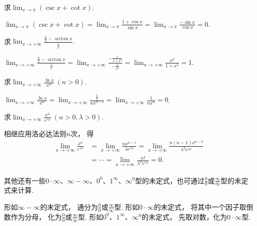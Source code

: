\begin{example}
求\(\lim_{x\to\pi} (\csc x+\cot x)\).
\begin{solution}
\(\lim_{x\to\pi} (\csc x+\cot x)
= \lim_{x\to\pi} \frac{1+\cos x}{\sin x}
= \lim_{x\to\pi} \frac{-\sin x}{\cos x}
= 0\).
\end{solution}
\end{example}

\begin{example}
求\(\lim_{x\to+\infty} \frac{\frac{\pi}{2} - \arctan x}{\frac{1}{x}}\).
\begin{solution}
\(\lim_{x\to+\infty} \frac{\frac{\pi}{2} - \arctan x}{\frac{1}{x}}
= \lim_{x\to+\infty} \frac{-\frac{1}{1+x^2}}{-\frac{1}{x^2}}
= \lim_{x\to+\infty} \frac{x^2}{1+x^2} = 1\).
\end{solution}
\end{example}

\begin{example}
求\(\lim_{x\to+\infty} \frac{\ln x}{x^n}\ (n>0)\).
\begin{solution}
\(\lim_{x\to+\infty} \frac{\ln x}{x^n}
= \lim_{x\to+\infty} \frac{\frac{1}{x}}{n x^{n-1}}
= \lim_{x\to+\infty} \frac{1}{n x^n} = 0\).
\end{solution}
\end{example}

\begin{example}
求\(\lim_{x\to+\infty} \frac{x^n}{e^{\lambda x}}\ (n>0,\lambda>0)\).
\begin{solution}
相继应用洛必达法则\(n\)次，
得\begin{align*}
	\lim_{x\to+\infty} \frac{x^n}{e^{\lambda x}}
	&= \lim_{x\to+\infty} \frac{n x^{n-1}}{\lambda e^{\lambda x}}
	= \lim_{x\to+\infty} \frac{n(n-1) x^{n-2}}{\lambda^2 e^{\lambda x}} \\
	&= \dotsb = \lim_{x\to+\infty} \frac{n!}{\lambda^n e^{\lambda x}}
	= 0.
\end{align*}
\end{solution}
\end{example}

其他还有一些\(0 \cdot \infty\)、\(\infty - \infty\)、\(0^0\)、\(1^\infty\)、\(\infty^0\)型的未定式，也可通过\(\frac{0}{0}\)或\(\frac{\infty}{\infty}\)型的未定式来计算.

形如\(\infty - \infty\)的未定式，
通分为\(\frac{0}{0}\)或\(\frac{\infty}{\infty}\)型.
形如\(0 \cdot \infty\)的未定式，
将其中一个因子取倒数作为分母，
化为\(\frac{0}{0}\)或\(\frac{\infty}{\infty}\)型.
形如\(0^0\)、\(1^\infty\)、\(\infty^0\)的未定式，
先取对数，化为\(0 \cdot \infty\)型.

